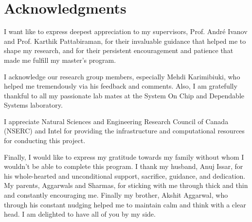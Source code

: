 
\chapter{Acknowledgments}

I want like to express deepest appreciation to my supervisors, Prof. Andr\'e Ivanov and Prof. Karthik Pattabiraman, for their invaluable guidance that helped me to shape my research, and for their persistent encouragement and patience that made me fulfill my master's program.





I acknowledge our research group members, especially Mehdi Karimibiuki, who helped me tremendously via his feedback and comments. Also, I am gratefully thankful to all my passionate lab mates at the System On Chip and Dependable Systems laboratory.

I appreciate Natural Sciences and Engineering Research Council of Canada (NSERC) and Intel for providing the infrastructure and computational resources for conducting this project.


Finally, I would like to express my gratitude towards my family without whom I wouldn't be able to complete this program. I thank my husband, Anuj Issar, for his whole-hearted and unconditional support, sacrifice, guidance, and dedication. My parents, Aggarwals and Sharmas, for sticking with me through thick and thin and constantly encouraging me. Finally my brother, Akshit Aggarwal, who through his constant nudging helped me to maintain calm and think with a clear head. I am delighted to have all of you by my side.



